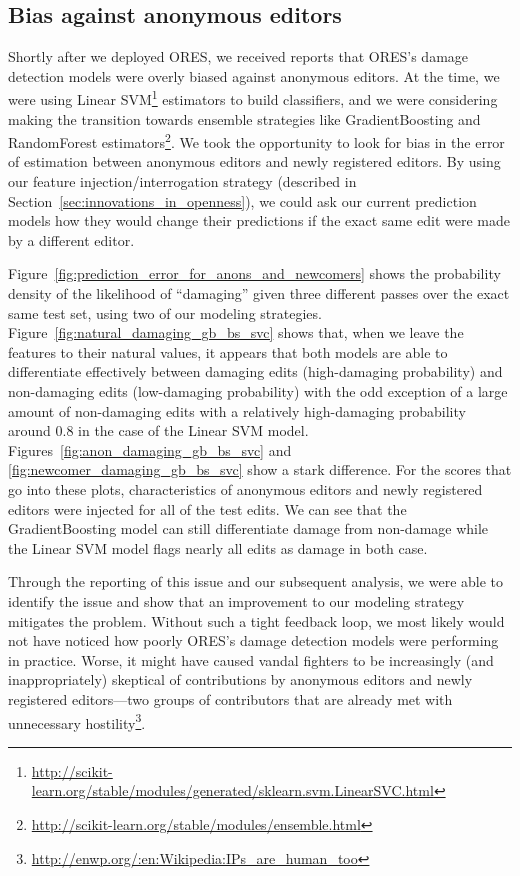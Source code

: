 \subsection{Bias against anonymous editors}
Shortly after we deployed ORES, we received reports that ORES's damage detection models were overly biased against anonymous editors.  At the time, we were using Linear SVM\footnote{\url{http://scikit-learn.org/stable/modules/generated/sklearn.svm.LinearSVC.html}} estimators to build classifiers, and we were considering making the transition towards ensemble strategies like GradientBoosting and RandomForest estimators\footnote{\url{http://scikit-learn.org/stable/modules/ensemble.html}}.  We took the opportunity to look for bias in the error of estimation between anonymous editors and newly registered editors.  By using our feature injection/interrogation strategy (described in Section~\ref{sec:innovations_in_openness}), we could ask our current prediction models how they would change their predictions if the exact same edit were made by a different editor.



Figure~\ref{fig:prediction_error_for_anons_and_newcomers} shows the probability density of the likelihood of ``damaging'' given three different passes over the exact same test set, using two of our modeling strategies.  Figure~\ref{fig:natural_damaging_gb_bs_svc} shows that, when we leave the features to their natural values, it appears that both models are able to differentiate effectively between damaging edits (high-damaging probability) and non-damaging edits (low-damaging probability) with the odd exception of a large amount of non-damaging edits with a relatively high-damaging probability around 0.8 in the case of the Linear SVM model.  Figures~\ref{fig:anon_damaging_gb_bs_svc} and \ref{fig:newcomer_damaging_gb_bs_svc} show a stark difference.  For the scores that go into these plots, characteristics of anonymous editors and newly registered editors were injected for all of the test edits.  We can see that the GradientBoosting model can still differentiate damage from non-damage while the Linear SVM model flags nearly all edits as damage in both case.

Through the reporting of this issue and our subsequent analysis, we were able to identify the issue and show that an improvement to our modeling strategy mitigates the problem.  Without such a tight feedback loop, we most likely would not have noticed how poorly ORES's damage detection models were performing in practice.  Worse, it might have caused vandal fighters to be increasingly (and inappropriately) skeptical of contributions by anonymous editors and newly registered editors---two groups of contributors that are already met with unnecessary hostility\footnote{\url{http://enwp.org/:en:Wikipedia:IPs_are_human_too}}\cite{halfaker2013rise}.

